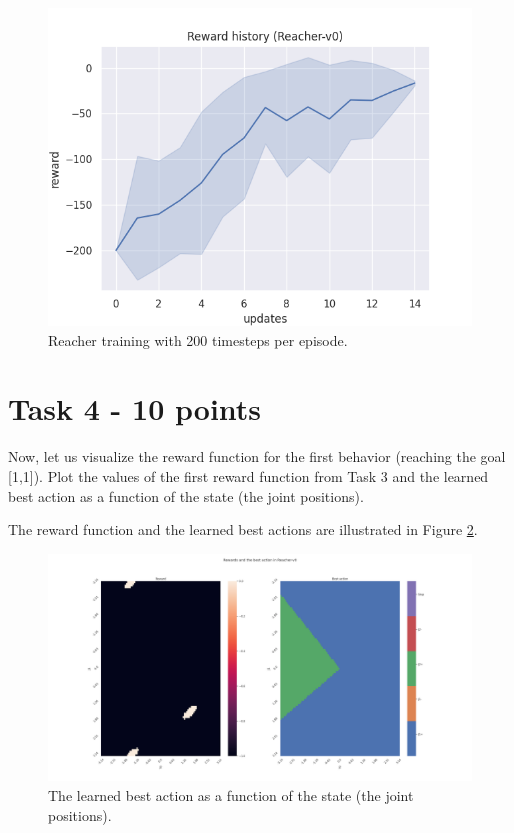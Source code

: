 \documentclass[12pt]{article}
\begin{document}
\begin{figure}[h] 
	\centering  %
    \includegraphics[width=0.9\columnwidth]{img/Figure_task3_1.png}
	\caption{Reacher training with 200 timesteps per episode.}
	\label{fig:fig31}
\end{figure}


\pagebreak
\section*{Task 4 - 10 points}

Now, let us visualize the reward function for the first behavior (reaching the goal [1,1]). Plot the values of the first reward function from Task 3 and the learned best action as a function of the state (the joint positions). 
\newline

\noindent
The reward function and the learned best actions are illustrated in Figure \ref*{fig:fig4}. 


\begin{figure}[h] 
	\centering  %
    \includegraphics[width=1.1\columnwidth]{img/Figure_task4.png}
	\caption{The learned best action as a function of the state (the joint positions).}
	\label{fig:fig4}
\end{figure}
\end{document}
